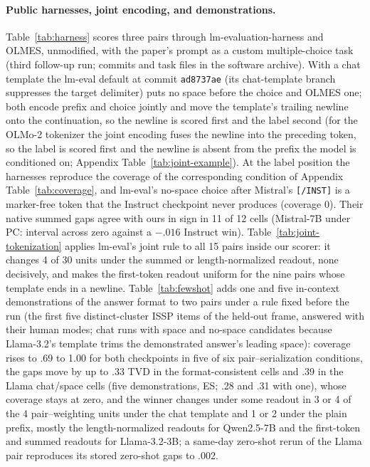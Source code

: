 \documentclass[11pt]{article}
\newcommand{\ES}{\textsc{ES}}
\newcommand{\PC}{\textsc{PC}}
\begin{document}
\paragraph{Public harnesses, joint encoding, and demonstrations.}
Table~\ref{tab:harness} scores three pairs through lm-evaluation-harness and OLMES, unmodified, with the paper's prompt as a custom multiple-choice task (third follow-up run; commits and task files in the software archive). With a chat template the lm-eval default at commit \texttt{ad8737ae} (its chat-template branch suppresses the target delimiter) puts no space before the choice and OLMES one; both encode prefix and choice jointly and move the template's trailing newline onto the continuation, so the newline is scored first and the label second (for the OLMo-2 tokenizer the joint encoding fuses the newline into the preceding token, so the label is scored first and the newline is absent from the prefix the model is conditioned on; Appendix Table~\ref{tab:joint-example}). At the label position the harnesses reproduce the coverage of the corresponding condition of Appendix Table~\ref{tab:coverage}, and lm-eval's no-space choice after Mistral's \texttt{[/INST]} is a marker-free token that the Instruct checkpoint never produces (coverage 0). Their native summed gaps agree with ours in sign in 11 of 12 cells (Mistral-7B under \PC{}: interval across zero against a $-.016$ Instruct win). Table~\ref{tab:joint-tokenization} applies lm-eval's joint rule to all 15 pairs inside our scorer: it changes 4 of 30 units under the summed or length-normalized readout, none decisively, and makes the first-token readout uniform for the nine pairs whose template ends in a newline. Table~\ref{tab:fewshot} adds one and five in-context demonstrations of the answer format to two pairs under a rule fixed before the run (the first five distinct-cluster ISSP items of the held-out frame, answered with their human modes; chat runs with space and no-space candidates because Llama-3.2's template trims the demonstrated answer's leading space): coverage rises to .69 to 1.00 for both checkpoints in five of six pair--serialization conditions, the gaps move by up to .33 TVD in the format-consistent cells and .39 in the Llama chat/space cells (five demonstrations, \ES{}; .28 and .31 with one), whose coverage stays at zero, and the winner changes under some readout in 3 or 4 of the 4 pair--weighting units under the chat template and 1 or 2 under the plain prefix, mostly the length-normalized readouts for Qwen2.5-7B and the first-token and summed readouts for Llama-3.2-3B; a same-day zero-shot rerun of the Llama pair reproduces its stored zero-shot gaps to .002.
\end{document}
